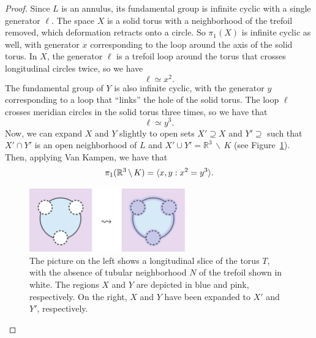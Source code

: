\documentclass[12pt,twoside]{reedthesis}
\theoremstyle{definition}
\newcommand{\R}{\mathbb{R}}
\newcommand{\wo}{\, \backslash \,}
\DeclarePairedDelimiter\ang{\langle}{\rangle}
\begin{document}
\begin{proof}
  Since $L$ is an annulus, its fundamental group is infinite cyclic with a single generator $\ell$.
  The space $X$ is a solid torus with a neighborhood of the trefoil removed, which deformation retracts onto a circle.
  So $\pi_1(X)$ is infinite cyclic as well, with generator $x$ corresponding to the loop around the axis of the solid torus.
  In $X$, the generator $\ell$ is a trefoil loop around the torus that crosses longitudinal circles twice, so we have
  \begin{equation*}
    \ell \simeq x^2.
  \end{equation*}
  The fundamental group of $Y$ is also infinite cyclic, with the generator $y$ corresponding to a loop that ``links'' the hole of the solid torus.
  The loop $\ell$ crosses meridian circles in the solid torus three times, so we have that
  \begin{equation*}
    \ell \simeq y^3.
  \end{equation*}
  Now, we can expand $X$ and $Y$ slightly to open sets $X' \supseteq X$ and $Y' \supseteq$ such that $X' \cap Y'$ is an open neighborhood of $L$ and $X' \cup Y' = \R^3 \wo K$ (see Figure~\ref{fig:fundamental_group_side}).
  Then, applying Van Kampen, we have that
  \begin{equation*}
    \pi_1(\R^3 \wo K) = \ang{x, y : x^2 = y^3}.
  \end{equation*}

  \begin{figure}[t]
    \centering
    \includegraphics[width=0.6\textwidth]{figures/fundamental_group_side.pdf}
    \caption{The picture on the left shows a longitudinal slice of the torus $T$, with the absence of tubular neighborhood $N$ of the trefoil shown in white. The regions $X$ and $Y$ are depicted in blue and pink, respectively. On the right, $X$ and $Y$ have been expanded to $X'$ and $Y'$, respectively.}
    \label{fig:fundamental_group_side}
  \end{figure}


\end{proof}
\end{document}
